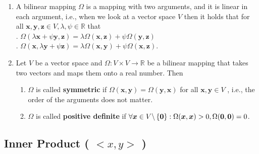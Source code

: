 \begin{enumerate}
    \item A bilinear mapping $\Omega$ is a mapping with two arguments, and it is linear in each argument, i.e., when we look at a vector space $V$ then it holds that for all $\bm{x}, \bm{y}, \bm{z} \in V, \lambda , \psi  \in \mathbb{R}$ that
    \hfill \cite{mfml/book/mml/Deisenroth-Faisal-Ong}
    \\
    .\hfill
    $\Omega(\lambda \bm{x} + \psi \bm{y}, \bm{z}) = \lambda \Omega(\bm{x}, \bm{z}) + \psi \Omega(\bm{y}, \bm{z})$
    \hfill \cite{mfml/book/mml/Deisenroth-Faisal-Ong}
    \\
    .\hfill
    $\Omega(\bm{x}, \lambda \bm{y} + \psi \bm{z}) = \lambda \Omega(\bm{x}, \bm{y}) + \psi \Omega(\bm{x}, \bm{z})$.
    \hfill \cite{mfml/book/mml/Deisenroth-Faisal-Ong}

    \item Let $V$ be a vector space and $\Omega : V \times  V \to \mathbb{R}$ be a bilinear mapping that takes two vectors and maps them onto a real number. Then
    \hfill \cite{mfml/book/mml/Deisenroth-Faisal-Ong}
    \begin{enumerate}
        \item $\Omega$ is called \textbf{symmetric} if $\Omega(\bm{x}, \bm{y}) = \Omega(\bm{y}, \bm{x})$ for all $\bm{x}, \bm{y} \in  V$ , i.e., the order of the arguments does not matter.
        \hfill \cite{mfml/book/mml/Deisenroth-Faisal-Ong}

        \item $\Omega$ is called \textbf{positive definite} if $\forall \bm{x} \in  V \backslash \left\{\bm{0}\right\} : \Omega(\bm{x}, \bm{x}) > 0 , \Omega(\bm{0}, \bm{0}) = 0$.
        \hfill \cite{mfml/book/mml/Deisenroth-Faisal-Ong}
    \end{enumerate}

\end{enumerate}





\subsection{Inner Product ( $<x, y>$ )}

